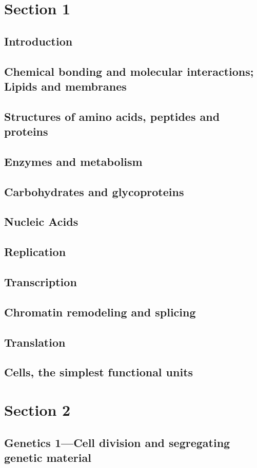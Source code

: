 \documentclass[../introbio.tex]{subfiles}
\begin{document}
\chapter{Section 1}
\section{Introduction}
\section{Chemical bonding and molecular interactions; Lipids and membranes}
\section{Structures of amino acids, peptides and proteins}
\section{Enzymes and metabolism}
\section{Carbohydrates and glycoproteins}
\section{Nucleic Acids}
\section{Replication}
\section{Transcription}
\section{Chromatin remodeling and splicing}
\section{Translation}
\section{Cells, the simplest functional units}
\chapter{Section 2}
\section{Genetics 1—Cell division and segregating genetic material}
\end{document}
